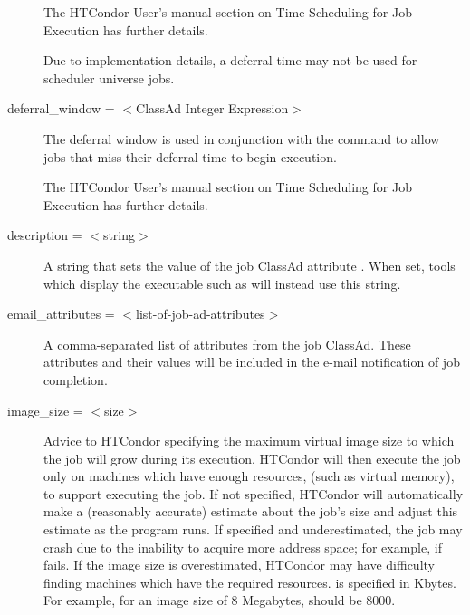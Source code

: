 \begin{description}
The HTCondor User's manual section on Time Scheduling for Job Execution
has further details.

Due to implementation details,
a deferral time may not be used for scheduler universe jobs.


\label{condor-submit-deferral-window}
\item[deferral\_window = $<$ClassAd Integer Expression$>$]
The deferral window is used in conjunction with the
 command to allow jobs that
miss their deferral time to begin execution.

The HTCondor User's manual section on Time Scheduling for Job Execution
has further details.


\label{condor-submit-description}
\item[description = $<$string$>$]
A string that sets the value of the job ClassAd attribute
.
When set, tools which display the executable such as 
will instead use this string.


\label{condor-submit-email-attributes}
\item[email\_attributes = $<$list-of-job-ad-attributes$>$] 
A comma-separated list of attributes from the job ClassAd. These
attributes and their values will be included in the e-mail notification
of job completion.


\label{condor-submit-image-size}
\item[image\_size = $<$size$>$] Advice to HTCondor specifying the maximum
virtual image size to which the job will grow during its execution.
HTCondor will then execute the job only on machines which have enough resources,
(such as virtual memory), to support executing the job.
If not specified, HTCondor will automatically make a (reasonably accurate)
estimate about the job's size and adjust this estimate as the program runs.
If specified and underestimated, the job may crash due to
the inability to acquire more address space; 
for example, if  fails. 
If the image size is overestimated,
HTCondor may have difficulty finding machines which have the required resources.
 is specified in Kbytes. 
For example, for an image size of 8 Megabytes,  should be 8000.


\end{description}
